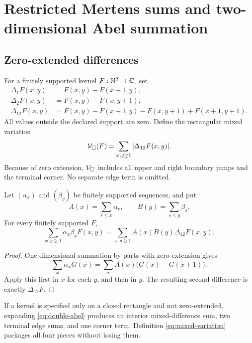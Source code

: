 \section{Restricted Mertens sums and two-dimensional Abel summation}
\label{sec:double-abel}

\subsection{Zero-extended differences}

For a finitely supported kernel \(F:\mathbb N^2\to\mathbb C\), set
\begin{align*}
 \Delta_1F(x,y)&=F(x,y)-F(x+1,y),\\
 \Delta_2F(x,y)&=F(x,y)-F(x,y+1),\\
 \Delta_{12}F(x,y)
 &=F(x,y)-F(x+1,y)-F(x,y+1)+F(x+1,y+1).
\end{align*}
All values outside the declared support are zero.  Define the rectangular
mixed variation
\begin{equation}
 \mathcal V_\square(F)
 =
 \sum_{x,y\ge1}|\Delta_{12}F(x,y)|.
\label{eq:mixed-variation}
\end{equation}
Because of zero extension, \(\mathcal V_\square\) includes all upper and right
boundary jumps and the terminal corner.  No separate edge term is omitted.

\begin{lemma}
\label{lem:double-abel}
Let \((\alpha_x)\) and \((\beta_y)\) be finitely supported sequences, and
put
\[
 A(x)=\sum_{r\le x}\alpha_r,
 \qquad
 B(y)=\sum_{s\le y}\beta_s.
\]
For every finitely supported \(F\),
\begin{equation}
 \boxed{
 \sum_{x,y\ge1}\alpha_x\beta_yF(x,y)
 =
 \sum_{x,y\ge1}A(x)B(y)\Delta_{12}F(x,y).}
\label{eq:double-abel}
\end{equation}
\end{lemma}

\begin{proof}
One-dimensional summation by parts with zero extension gives
\[
 \sum_x\alpha_xG(x)
 =
 \sum_xA(x)\bigl(G(x)-G(x+1)\bigr).
\]
Apply this first in \(x\) for each \(y\), and then in \(y\).  The resulting
second difference is exactly \(\Delta_{12}F\).
\end{proof}

\begin{remark}
If a kernel is specified only on a closed rectangle and not zero-extended,
expanding \eqref{eq:double-abel} produces an interior mixed-difference sum,
two terminal edge sums, and one corner term.  Definition
\eqref{eq:mixed-variation} packages all four pieces without losing them.
\end{remark}

